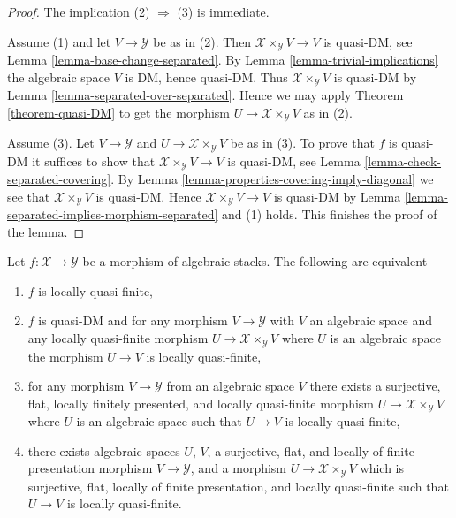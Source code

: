 \begin{proof}
The implication (2) $\Rightarrow$ (3) is immediate.

\medskip\noindent
Assume (1) and let $V \to \mathcal{Y}$ be as in (2). Then
$\mathcal{X} \times_\mathcal{Y} V \to V$ is quasi-DM, see
Lemma \ref{lemma-base-change-separated}.
By
Lemma \ref{lemma-trivial-implications}
the algebraic space $V$ is DM, hence quasi-DM. Thus
$\mathcal{X} \times_\mathcal{Y} V$ is quasi-DM by
Lemma \ref{lemma-separated-over-separated}.
Hence we may apply
Theorem \ref{theorem-quasi-DM}
to get the morphism $U \to \mathcal{X} \times_\mathcal{Y} V$
as in (2).

\medskip\noindent
Assume (3). Let $V \to \mathcal{Y}$ and
$U \to \mathcal{X} \times_\mathcal{Y} V$ be as in (3).
To prove that $f$ is quasi-DM it suffices to show that
$\mathcal{X} \times_\mathcal{Y} V \to V$ is quasi-DM, see
Lemma \ref{lemma-check-separated-covering}.
By
Lemma \ref{lemma-properties-covering-imply-diagonal}
we see that $\mathcal{X} \times_\mathcal{Y} V$ is quasi-DM.
Hence $\mathcal{X} \times_\mathcal{Y} V \to V$ is quasi-DM by
Lemma \ref{lemma-separated-implies-morphism-separated}
and (1) holds. This finishes the proof of the lemma.
\end{proof}

\begin{lemma}
\label{lemma-characterize-locally-quasi-finite}
Let $f : \mathcal{X} \to \mathcal{Y}$ be a morphism of algebraic stacks.
The following are equivalent
\begin{enumerate}
\item $f$ is locally quasi-finite,
\item $f$ is quasi-DM and for any morphism $V \to \mathcal{Y}$ with $V$
an algebraic space and any locally quasi-finite morphism
$U \to \mathcal{X} \times_\mathcal{Y} V$ where $U$ is an algebraic space
the morphism $U \to V$ is locally quasi-finite,
\item for any morphism $V \to \mathcal{Y}$ from an algebraic space $V$
there exists a surjective, flat, locally finitely presented, and locally
quasi-finite morphism $U \to \mathcal{X} \times_\mathcal{Y} V$ where
$U$ is an algebraic space such that $U \to V$ is locally quasi-finite,
\item there exists algebraic spaces $U$, $V$, a surjective, flat,
and locally of finite presentation morphism $V \to \mathcal{Y}$,
and a morphism $U \to \mathcal{X} \times_\mathcal{Y} V$ which
is surjective, flat, locally of finite presentation, and
locally quasi-finite such that $U \to V$ is locally quasi-finite.
\end{enumerate}
\end{lemma}

